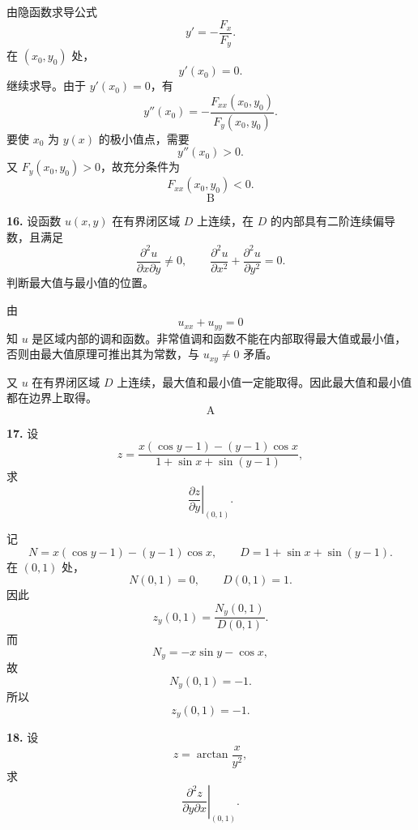 \begin{solutionblock}
由隐函数求导公式
\[
y'=-\frac{F_x}{F_y}.
\]
在 \((x_0,y_0)\) 处，
\[
y'(x_0)=0.
\]
继续求导。由于 \(y'(x_0)=0\)，有
\[
y''(x_0)=-\frac{F_{xx}(x_0,y_0)}{F_y(x_0,y_0)}.
\]
要使 \(x_0\) 为 \(y(x)\) 的极小值点，需要
\[
y''(x_0)>0.
\]
又 \(F_y(x_0,y_0)>0\)，故充分条件为
\[
F_{xx}(x_0,y_0)<0.
\]
\[
\boxed{\text{B}}
\]
\end{solutionblock}

\begin{problemblock}
\textbf{16.} 设函数 \(u(x,y)\) 在有界闭区域 \(D\) 上连续，在 \(D\) 的内部具有二阶连续偏导数，且满足
\[
\frac{\partial^2u}{\partial x\partial y}\ne0,\qquad
\frac{\partial^2u}{\partial x^2}+\frac{\partial^2u}{\partial y^2}=0.
\]
判断最大值与最小值的位置。
\end{problemblock}

\begin{solutionblock}
由
\[
u_{xx}+u_{yy}=0
\]
知 \(u\) 是区域内部的调和函数。非常值调和函数不能在内部取得最大值或最小值，否则由最大值原理可推出其为常数，与 \(u_{xy}\ne0\) 矛盾。

又 \(u\) 在有界闭区域 \(D\) 上连续，最大值和最小值一定能取得。因此最大值和最小值都在边界上取得。
\[
\boxed{\text{A}}
\]
\end{solutionblock}

\begin{problemblock}
\textbf{17.} 设
\[
z=\frac{x(\cos y-1)-(y-1)\cos x}{1+\sin x+\sin(y-1)},
\]
求
\[
\left.\frac{\partial z}{\partial y}\right|_{(0,1)}.
\]
\end{problemblock}

\begin{solutionblock}
记
\[
N=x(\cos y-1)-(y-1)\cos x,\qquad
D=1+\sin x+\sin(y-1).
\]
在 \((0,1)\) 处，
\[
N(0,1)=0,\qquad D(0,1)=1.
\]
因此
\[
z_y(0,1)=\frac{N_y(0,1)}{D(0,1)}.
\]
而
\[
N_y=-x\sin y-\cos x,
\]
故
\[
N_y(0,1)=-1.
\]
所以
\[
\boxed{z_y(0,1)=-1}.
\]
\end{solutionblock}

\begin{problemblock}
\textbf{18.} 设
\[
z=\arctan\frac{x}{y^2},
\]
求
\[
\left.\frac{\partial^2z}{\partial y\partial x}\right|_{(0,1)}.
\]
\end{problemblock}

